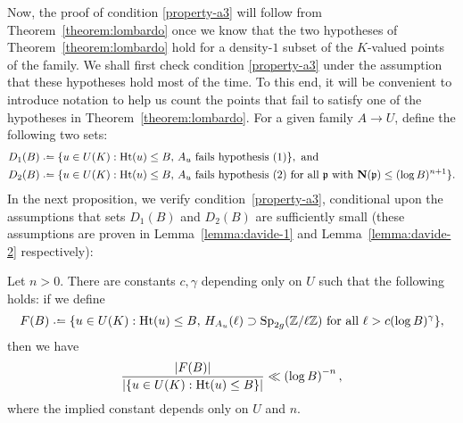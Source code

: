 Now, the proof of condition \ref{property-a3} will follow from Theorem~\ref{theorem:lombardo} once we know that the two hypotheses of Theorem~\ref{theorem:lombardo} hold for a density-$1$ subset of the $K$-valued points of the family. We shall first check condition \ref{property-a3} under the assumption that these hypotheses hold most of the time.
To this end, it will be convenient to introduce notation to help us count the points that fail to satisfy one of the hypotheses in Theorem~\ref{theorem:lombardo}. For a given family $A \to U$, define the following two sets:
\begin{align*}
D_1(B) & \defeq \{u \in U(K) : \on{Ht}(u) \le B,\,\text{$A_u$ fails hypothesis (1)}\}, \text{ and} \\
D_2(B) & \defeq \{u \in U(K) : \on{Ht}(u) \le B,\, \text{$A_u$ fails hypothesis (2) for all $\mf{p}$ with $\N(\mf{p}) \le (\log B)^{n+1}$}\}.
\end{align*}
In the next proposition, we verify condition~\ref{property-a3}, conditional upon the assumptions that sets $D_1(B)$ and $D_2(B)$ are sufficiently small (these assumptions are proven in Lemma~\ref{lemma:davide-1} and Lemma~\ref{lemma:davide-2} respectively):
\begin{proposition} \label{proposition:check-C}
Let $n>0$. There are constants $c, \gamma$ depending only on $U$ such that the following holds: if we define
		\[
		F(B) \defeq \{u \in U(K) : \on{Ht}(u) \le B,\, \mono_{A_u}(\ell) \supset \Sp_{2g}(\bz / \ell \ZZ) \text{ for all } \ell > c(\log B)^\gamma\},
		\]
		then we have
		\begin{equation} \label{yousayyourefineIknowyoubetterthanthat}
			\frac{|F(B)|}{|\{u \in U(K) : \operatorname{Ht}(u) \le B\}|} \ll \left( \log B \right)^{-n},
		\end{equation}
        where the implied constant depends only on $U$ and $n$.
	\end{proposition}
